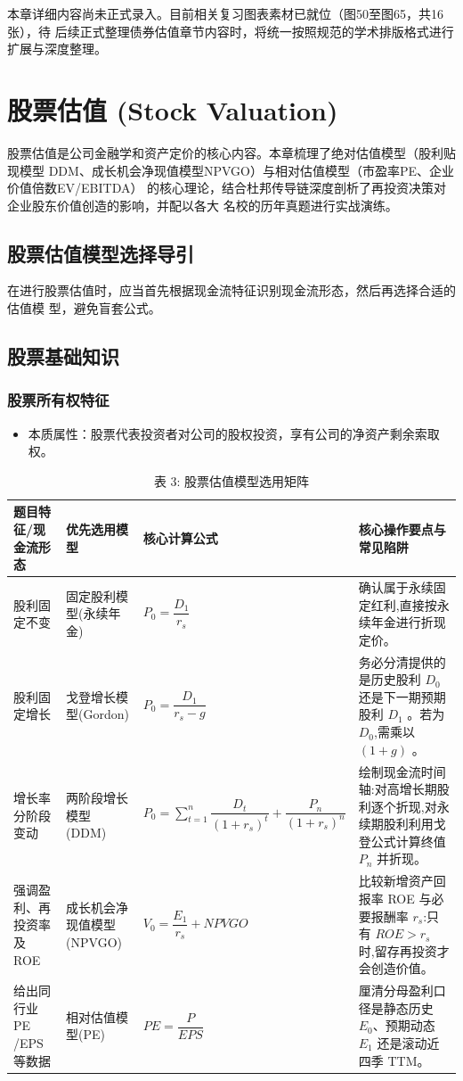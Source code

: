 \documentclass[lang=cn,10pt,color=blue]{elegantbook}
\begin{document}
本章详细内容尚未正式录入。目前相关复习图表素材已就位（图50至图65，共16张），待 后续正式整理债券估值章节内容时，将统一按照规范的学术排版格式进行扩展与深度整理。 

\chapter{股票估值 (Stock Valuation)}

股票估值是公司金融学和资产定价的核心内容。本章梳理了绝对估值模型（股利贴现模型 DDM、成长机会净现值模型NPVGO）与相对估值模型（市盈率PE、企业价值倍数EV/EBITDA） 的核心理论，结合杜邦传导链深度剖析了再投资决策对企业股东价值创造的影响，并配以各大 名校的历年真题进行实战演练。 

\section{股票估值模型选择导引}

在进行股票估值时，应当首先根据现金流特征识别现金流形态，然后再选择合适的估值模 型，避免盲套公式。 

\section{股票基础知识}

\subsection{股票所有权特征}

\begin{itemize}
  \item 本质属性：股票代表投资者对公司的股权投资，享有公司的净资产剩余索取权。
\end{itemize}

\begin{table}[ht]
  \centering
  \caption{表 3: 股票估值模型选用矩阵}
  \renewcommand{\arraystretch}{1.4}
\begin{tabularx}{\textwidth}{llYY}
  \toprule
  题目特征/现金流形态 & 优先选用模型 & 核心计算公式 & 核心操作要点与常见陷阱 \\
  \midrule
  股利固定不变 & 固定股利模型(永续年金) & $P_0 = \dfrac{D_1}{r_s}$ & 确认属于永续固定红利,直接按永续年金进行折现定价。 \\
  股利固定增长 & 戈登增长模型(Gordon) & $P_0 = \dfrac{D_1}{r_s - g}$ & 务必分清提供的是历史股利 $D_0$ 还是下一期预期股利 $D_1$ 。若为 $D_0$,需乘以 $(1 + g)$ 。 \\
  增长率分阶段变动 & 两阶段增长模型 (DDM) & $P_0 = \sum_{t=1}^{n} \dfrac{D_t}{(1 + r_s)^t} + \dfrac{P_n}{(1 + r_s)^n}$ & 绘制现金流时间轴:对高增长期股利逐个折现,对永续期股利利用戈登公式计算终值 $P_n$ 并折现。 \\
  强调盈利、再投资率及 ROE & 成长机会净现值模型(NPVGO) & $V_0 = \dfrac{E_1}{r_s} + NPVGO$ & 比较新增资产回报率 ROE 与必要报酬率 $r_s$:只有 $ROE > r_s$ 时,留存再投资才会创造价值。 \\
  给出同行业 PE /EPS 等数据 & 相对估值模型(PE) & $PE = \dfrac{P}{EPS}$ & 厘清分母盈利口径是静态历史 $E_0$、预期动态 $E_1$ 还是滚动近四季 TTM。 \\
  \bottomrule
\end{tabularx}
\end{table}
\end{document}
